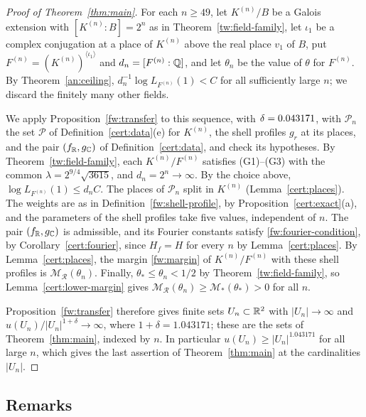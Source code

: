 \begin{proof}[Proof of Theorem~\ref{thm:main}]
For each $n\ge49$, let $K^{(n)}/B$ be a Galois extension with
$[K^{(n)}:B]=2^n$ as in Theorem~\ref{tw:field-family}, let $\iota_1$ be
a complex conjugation at a place of $K^{(n)}$ above the real place $v_1$
of $B$, put $F^{(n)}=(K^{(n)})^{\langle\iota_1\rangle}$ and
$d_n=[F^{(n)}:\mathbb Q]$, and let $\theta_n$ be the value of $\theta$ for
$F^{(n)}$. By Theorem~\ref{an:ceiling}, $d_n^{-1}\log L_{F^{(n)}}(1)<C$
for all sufficiently large $n$; we discard the finitely many other
fields.

We apply Proposition~\ref{fw:transfer} to this sequence, with
$\delta=0.043171$, with $\mathcal P_n$ the set $\mathcal P$ of
Definition~\ref{cert:data}(e) for $K^{(n)}$, the shell profiles $g_r$ at its
places, and the pair $(f_\mathbb R,g_\mathbb C)$ of Definition~\ref{cert:data}, and check
its hypotheses. By Theorem~\ref{tw:field-family}, each $K^{(n)}/F^{(n)}$
satisfies (G1)--(G3) with the common $\lambda=2^{9/4}\sqrt{3615}$, and
$d_n=2^n\to\infty$. By the choice above, $\log L_{F^{(n)}}(1)\le d_nC$. The
places of $\mathcal P_n$ split in $K^{(n)}$ (Lemma~\ref{cert:places}). The
weights are as in Definition~\ref{fw:shell-profile}, by
Proposition~\ref{cert:exact}(a), and the parameters of the shell profiles take
five values, independent of $n$. The pair $(f_\mathbb R,g_\mathbb C)$ is admissible, and its
Fourier constants satisfy \eqref{fw:fourier-condition}, by
Corollary~\ref{cert:fourier}, since $H_f=H$ for every $n$ by
Lemma~\ref{cert:places}. By Lemma~\ref{cert:places}, the margin
\eqref{fw:margin} of $K^{(n)}/F^{(n)}$ with these shell profiles is
$\mathcal M_{\mathcal R}(\theta_n)$. Finally, $\theta_*\le\theta_n<1/2$ by
Theorem~\ref{tw:field-family}, so Lemma~\ref{cert:lower-margin} gives
$\mathcal M_{\mathcal R}(\theta_n)\ge\mathcal M_*(\theta_*)>0$ for all $n$.

Proposition~\ref{fw:transfer} therefore gives finite sets
$U_n\subset\mathbb R^2$ with $|U_n|\to\infty$ and
$u(U_n)/|U_n|^{1+\delta}\to\infty$, where $1+\delta=1.043171$; these are
the sets of Theorem~\ref{thm:main}, indexed by $n$. In particular
$u(U_n)\ge|U_n|^{1.043171}$ for all large $n$, which gives the last
assertion of Theorem~\ref{thm:main} at the cardinalities $|U_n|$.
\end{proof}

\subsection{Remarks}

